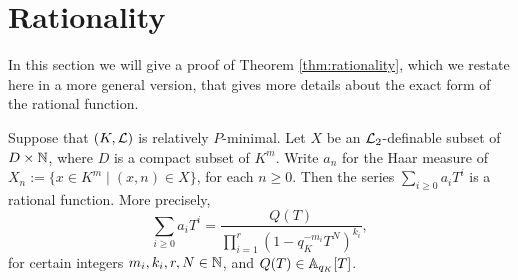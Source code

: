 \section{Rationality}
In this section we will give a proof of Theorem \ref{thm:rationality}, which we restate here in a more general version, that gives more details about the exact form of the rational function. 
\begin{thm}\label{thm:rationalitygeneral}
Suppose that $(K,\cL)$ is relatively $P$-minimal. Let $X$ be an $\cL_2$-definable subset of $D\times \NN$, where $D$ is a compact subset of $K^m$.  Write $a_n$ for the Haar measure of $X_n:=\{x\in K^m\mid (x,n)\in X\}$, for each $n\geq 0$. Then the series $\sum_{i\geq 0} a_i T^i$ is a rational function. More precisely, 
\[\sum_{i\geq 0} a_i T^i = \frac{Q(T) }{\prod_{i=1}^r(1-q_K^{-m_i}T^N)^{k_i}},\]
for certain integers $m_i, k_i,r, N \in \NN$, and $Q(T) \in \AA_{q_K}[T]$. 
\end{thm}
